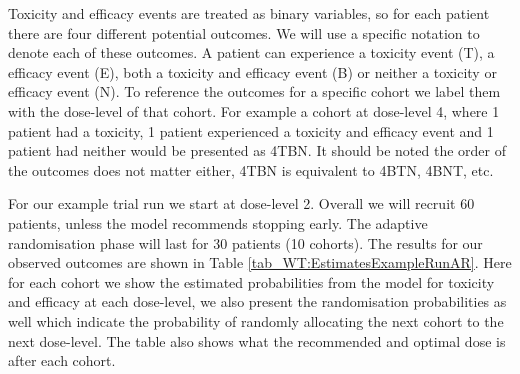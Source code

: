 Toxicity and efficacy events are treated as binary variables, so for each patient there are four different potential outcomes. We will use a specific notation to denote each of these outcomes. A patient can experience a toxicity event (T), a efficacy event (E), both a toxicity and efficacy event (B) or neither a toxicity or efficacy event (N). To reference the outcomes for a specific cohort we label them with the dose-level of that cohort. For example a cohort at dose-level 4, where 1 patient had a toxicity, 1 patient experienced a toxicity and efficacy event and 1 patient had neither would be presented as 4TBN. It should be noted the order of the outcomes does not matter either, 4TBN is equivalent to 4BTN, 4BNT, etc. 

For our example trial run we start at dose-level 2. Overall we will recruit 60 patients, unless the model recommends stopping early. The adaptive randomisation phase will last for 30 patients (10 cohorts). The results for our observed outcomes are shown in Table \ref{tab_WT:EstimatesExampleRunAR}. Here for each cohort we show the estimated probabilities from the model for toxicity and efficacy at each dose-level, we also present the randomisation probabilities as well which indicate the probability of randomly allocating the next cohort to the next dose-level. The table also shows what the recommended and optimal dose is after each cohort. 

